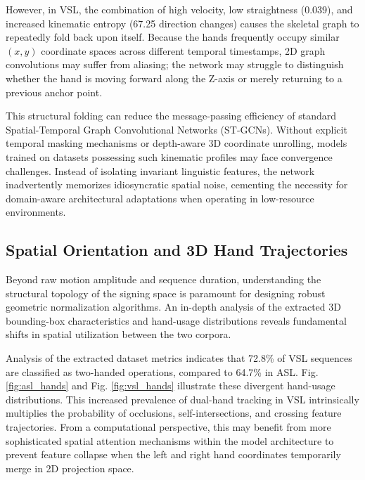 \documentclass{ieeeaccess}
\begin{document}
However, in VSL, the combination of high velocity, low straightness (0.039), and increased kinematic entropy (67.25 direction changes) causes the skeletal graph to repeatedly fold back upon itself. Because the hands frequently occupy similar $(x, y)$ coordinate spaces across different temporal timestamps, 2D graph convolutions may suffer from aliasing; the network may struggle to distinguish whether the hand is moving forward along the Z-axis or merely returning to a previous anchor point. 

This structural folding can reduce the message-passing efficiency of standard Spatial-Temporal Graph Convolutional Networks (ST-GCNs). Without explicit temporal masking mechanisms or depth-aware 3D coordinate unrolling, models trained on datasets possessing such kinematic profiles may face convergence challenges. Instead of isolating invariant linguistic features, the network inadvertently memorizes idiosyncratic spatial noise, cementing the necessity for domain-aware architectural adaptations when operating in low-resource environments.

\subsection{Spatial Orientation and 3D Hand Trajectories}
\label{sec:spatial_orientation}

Beyond raw motion amplitude and sequence duration, understanding the structural topology of the signing space is paramount for designing robust geometric normalization algorithms. An in-depth analysis of the extracted 3D bounding-box characteristics and hand-usage distributions reveals fundamental shifts in spatial utilization between the two corpora. 

Analysis of the extracted dataset metrics indicates that 72.8\% of VSL sequences are classified as two-handed operations, compared to 64.7\% in ASL. Fig. \ref{fig:asl_hands} and Fig. \ref{fig:vsl_hands} illustrate these divergent hand-usage distributions. This increased prevalence of dual-hand tracking in VSL intrinsically multiplies the probability of occlusions, self-intersections, and crossing feature trajectories. From a computational perspective, this may benefit from more sophisticated spatial attention mechanisms within the model architecture to prevent feature collapse when the left and right hand coordinates temporarily merge in 2D projection space.
\end{document}
